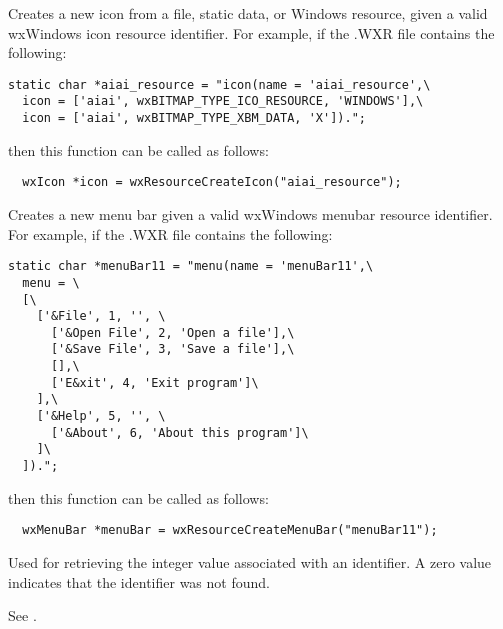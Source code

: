 

Creates a new icon from a file, static data, or Windows resource, given a valid
wxWindows icon resource identifier. For example, if the .WXR file contains
the following:

\begin{verbatim}
static char *aiai_resource = "icon(name = 'aiai_resource',\
  icon = ['aiai', wxBITMAP_TYPE_ICO_RESOURCE, 'WINDOWS'],\
  icon = ['aiai', wxBITMAP_TYPE_XBM_DATA, 'X']).";
\end{verbatim}

then this function can be called as follows:

\begin{verbatim}
  wxIcon *icon = wxResourceCreateIcon("aiai_resource");
\end{verbatim}



Creates a new menu bar given a valid wxWindows menubar resource
identifier. For example, if the .WXR file contains the following:

\begin{verbatim}
static char *menuBar11 = "menu(name = 'menuBar11',\
  menu = \
  [\
    ['&File', 1, '', \
      ['&Open File', 2, 'Open a file'],\
      ['&Save File', 3, 'Save a file'],\
      [],\
      ['E&xit', 4, 'Exit program']\
    ],\
    ['&Help', 5, '', \
      ['&About', 6, 'About this program']\
    ]\
  ]).";
\end{verbatim}

then this function can be called as follows:

\begin{verbatim}
  wxMenuBar *menuBar = wxResourceCreateMenuBar("menuBar11");
\end{verbatim}




Used for retrieving the integer value associated with an identifier.
A zero value indicates that the identifier was not found.

See .

\label{wxresourcedata}

